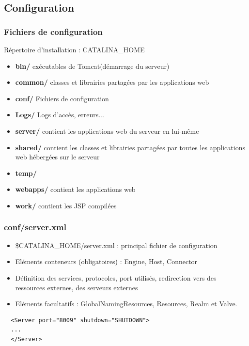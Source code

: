 \subsection{Configuration}
\begin{frame}
  \frametitle{Fichiers de configuration}

		Répertoire d'installation : CATALINA\_HOME
\begin{itemize} 
    \item \textbf{bin/} exécutables de Tomcat(démarrage du serveur)
    \item \textbf{common/} classes et librairies partagées par les applications web
    \item \textbf{conf/} Fichiers de configuration
    \item \textbf{Logs/} Logs d'accès, erreurs...
    \item \textbf{server/} contient les applications web du serveur en lui-même
    \item \textbf{shared/} contient les classes et librairies partagées par toutes les applications web hébergées sur le serveur
    \item \textbf{temp/}
    \item \textbf{webapps/} contient les applications web
    \item \textbf{work/} contient les JSP compilées
\end{itemize} 
\end{frame}


\begin{frame}[fragile]
  \frametitle{conf/server.xml}

\begin{itemize}
  \item \$CATALINA\_HOME/server.xml : principal fichier de configuration
  \item Eléments conteneurs (obligatoires) : Engine, Host, Connector
  \item Définition des services, protocoles, port utilisés, redirection vers des ressources externes, des serveurs externes
  \item Eléments facultatifs : GlobalNamingResources, Resources, Realm et Valve.
\end{itemize} 

\begin{lstlisting}
  <Server port="8009" shutdown="SHUTDOWN">
  ...
  </Server>
\end{lstlisting}
		
\end{frame}


